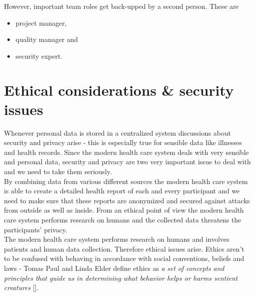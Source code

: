 \documentclass[a4paper,11pt]{article}
\providecommand*{\note}[1]{\small \textcolor{RoyalBlue}{\begin{minipage}{\textwidth}{#1}\end{minipage}}}
\begin{document}
However, important team roles get back-upped by a second person. These are
\begin{itemize}
\item project manager,
\item quality manager and
\item security expert.
\end{itemize}

\section{Ethical considerations \& security issues}
\label{sect:ethics-security}


Whenever personal data is stored in a centralized system discussions about security and privacy arise - this is especially true for sensible data like illnesses and health records. Since the modern health care system deals with very sensible and personal data, security and privacy are two very important issue to deal with and we need to take them seriously. \\

By combining data from various different sources the modern health care system is able to create a detailed health report of each and every participant and we need to make sure that these reports are anonymized and secured against attacks from outside as well as inside. From an ethical point of view the modern health care system performs research on humans and the collected data threatens the participants' privacy. \\

The modern health care system performs research on humans and involves patients and human data collection. Therefore ethical issues arise. Ethics aren't to be confused with behaving in accordance with social conventions, beliefs and laws - Tomas Paul and Linda Elder define ethics as \emph{a set of concepts and principles that guide us in determining what behavior helps or harms sentient creatures} [\cite{paul2006thinker}]. \\
\end{document}
